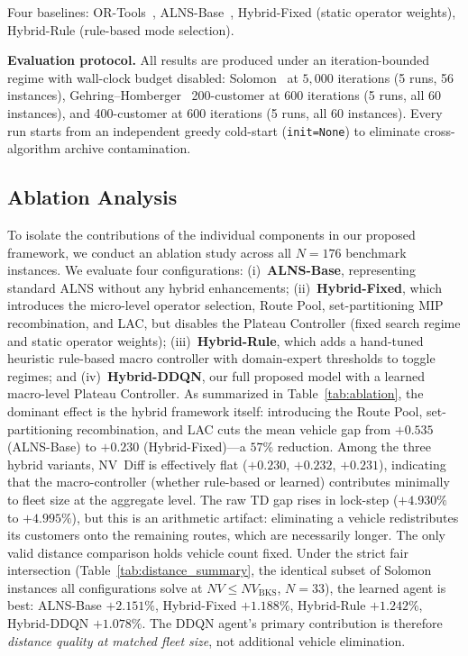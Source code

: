\documentclass[journal]{IEEEtran}
\newcommand{\BKS}{\text{BKS}}
\begin{document}
Four baselines: OR-Tools~\cite{ortools}, ALNS-Base~\cite{Ropke2006},
Hybrid-Fixed (static operator weights), Hybrid-Rule (rule-based mode
selection).

\textbf{Evaluation protocol.} All results are produced under an
iteration-bounded regime with wall-clock budget disabled:
Solomon~\cite{Solomon1987} at $5{,}000$ iterations (5 runs, 56 instances),
Gehring--Homberger~\cite{Gehring1999} 200-customer at $600$ iterations
(5 runs, all 60 instances), and 400-customer at $600$ iterations (5 runs,
all 60 instances).  Every run starts from an independent greedy cold-start
(\texttt{init=None}) to eliminate cross-algorithm archive contamination.



\subsection{Ablation Analysis}

To isolate the contributions of the individual components in our proposed framework, we conduct an ablation study across all $N{=}176$ benchmark instances. We evaluate four configurations:
(i)~\textbf{ALNS-Base}, representing standard ALNS without any hybrid enhancements;
(ii)~\textbf{Hybrid-Fixed}, which introduces the micro-level operator selection, Route Pool, set-partitioning MIP recombination, and LAC, but disables the Plateau Controller (fixed search regime and static operator weights);
(iii)~\textbf{Hybrid-Rule}, which adds a hand-tuned heuristic rule-based macro controller with domain-expert thresholds to toggle regimes; and
(iv)~\textbf{Hybrid-DDQN}, our full proposed model with a learned macro-level Plateau Controller.
As summarized in Table~\ref{tab:ablation}, the dominant effect is the hybrid
framework itself: introducing the Route Pool, set-partitioning recombination,
and LAC cuts the mean vehicle gap from $+0.535$ (ALNS-Base) to $+0.230$
(Hybrid-Fixed)---a $57\%$ reduction.  Among the three hybrid variants, NV~Diff
is effectively flat ($+0.230$, $+0.232$, $+0.231$), indicating that the
macro-controller (whether rule-based or learned) contributes minimally to fleet
size at the aggregate level.  The raw TD gap rises in lock-step ($+4.930\%$
to $+4.995\%$), but this is an arithmetic artifact: eliminating a vehicle
redistributes its customers onto the remaining routes, which are necessarily
longer.  The only valid distance comparison holds vehicle count fixed.
Under the strict fair intersection
(Table~\ref{tab:distance_summary}, the identical subset of Solomon instances
all configurations solve at $NV\le NV_{\BKS}$, $N{=}33$), the learned agent
is best: ALNS-Base $+2.151\%$, Hybrid-Fixed $+1.188\%$, Hybrid-Rule
$+1.242\%$, Hybrid-DDQN $\mathbf{+1.078\%}$.  The DDQN agent's primary
contribution is therefore \emph{distance quality at matched fleet size},
not additional vehicle elimination.
\end{document}
